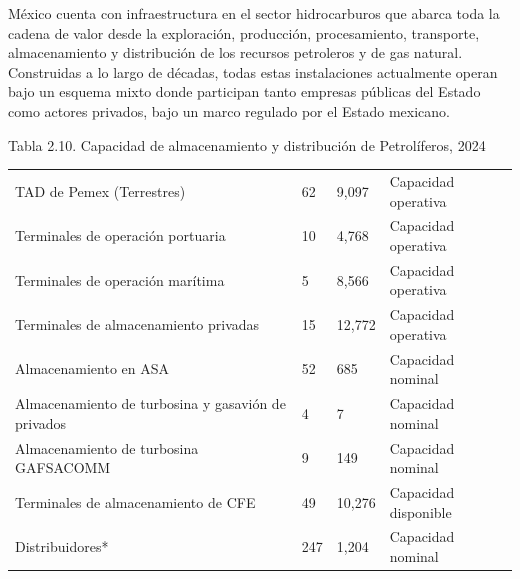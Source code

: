\documentclass{sener2025}
\begin{document}
México cuenta con infraestructura en el sector hidrocarburos que abarca toda la cadena de valor desde la exploración, producción, procesamiento, transporte, almacenamiento y distribución de los recursos petroleros y de gas natural. Construidas a lo largo de décadas, todas estas instalaciones actualmente operan bajo un esquema mixto donde participan tanto empresas públicas del Estado como actores privados, bajo un marco regulado por el Estado mexicano.
\begin{tabladoradoCorto}
  \caption{Tabla 2.10. Capacidad de almacenamiento y distribución de Petrolíferos, 2024}
  \label{tab:tabla_2_10__capacidad_de_almac}
  \begin{tabularx}{\textwidth}{Vvvv}
    \toprule
      &  &  & \encabezadodorado{} \\
    \midrule
    TAD de Pemex (Terrestres) & 62 & 9,097 & Capacidad operativa \\
    Terminales de operación portuaria & 10 & 4,768 & Capacidad operativa \\
    Terminales de operación marítima & 5 & 8,566 & Capacidad operativa \\
    Terminales de almacenamiento privadas & 15 & 12,772 & Capacidad operativa \\
    Almacenamiento en ASA & 52 & 685 & Capacidad nominal \\
    Almacenamiento de turbosina y gasavión de privados & 4  & 7 & Capacidad nominal \\
    Almacenamiento de turbosina GAFSACOMM & 9 & 149 & Capacidad nominal \\
    Terminales de almacenamiento de CFE & 49 & 10,276 & Capacidad disponible \\
    Distribuidores* & 247 & 1,204 & Capacidad nominal \\
    \bottomrule
  \end{tabularx}
\end{tabladoradoCorto}
\vspace{-4pt}
\end{document}
